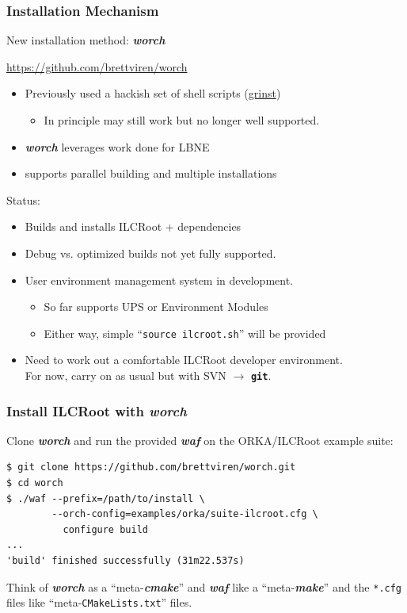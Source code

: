 \documentclass[xcolor=dvipsnames]{beamer}
\newcommand{\app}[1]{\textbf{\textit{#1}}\xspace}
\def\waf{\app{waf}}
\def\worch{\app{worch}}
\newcommand{\git}{\texttt{\textbf{git}}\xspace}
\begin{document}
\begin{frame}
  \frametitle{Installation Mechanism}
  
  New installation method: \worch

  \begin{center}
    \url{https://github.com/brettviren/worch} 
  \end{center}

  \begin{itemize}
  \item Previously used a hackish set of shell scripts (\href{https://github.com/brettviren/grinst}{grinst})
    \begin{itemize}
    \item In principle may still work but no longer well supported.
    \end{itemize}
  \item \worch leverages work done for LBNE
  \item supports parallel building and multiple installations
  \end{itemize}

    Status:
    \begin{itemize}
    \item Builds and installs ILCRoot + dependencies
    \item Debug vs. optimized builds not yet fully supported.
    \item User environment management system in development.
      \begin{itemize}
      \item So far supports UPS or Environment Modules
      \item Either way, simple ``\texttt{source ilcroot.sh}'' will be provided
      \end{itemize}
    \item Need to work out a comfortable ILCRoot developer environment.  \\
      For now, carry on as usual but with SVN $\rightarrow$ \git.
    \end{itemize}

\end{frame}

\begin{frame}[fragile]
  \frametitle{Install ILCRoot with \worch{}}

Clone \worch and run the provided \waf on the ORKA/ILCRoot example suite:

{\footnotesize
\begin{verbatim}
$ git clone https://github.com/brettviren/worch.git
$ cd worch
$ ./waf --prefix=/path/to/install \
        --orch-config=examples/orka/suite-ilcroot.cfg \
          configure build
...
'build' finished successfully (31m22.537s)
\end{verbatim}
}

  Think of \worch as a ``meta-\app{cmake}'' and \waf like a
  ``meta-\app{make}'' and the \texttt{*.cfg} files like
  ``meta-\texttt{CMakeLists.txt}'' files.

\end{frame}
\end{document}
